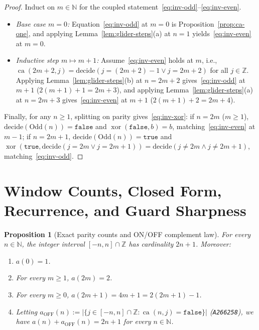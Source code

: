 \documentclass[11pt]{article}
\newtheorem{proposition}[theorem]{Proposition}
\theoremstyle{definition}
\newcommand{\N}{\mathbb{N}}
\newcommand{\Z}{\mathbb{Z}}
\newcommand{\seq}[1]{\texttt{#1}}
\newcommand{\ca}{\operatorname{ca}}
\begin{document}
\begin{proof}
Induct on $m \in \N$ for the coupled statement~\eqref{eq:inv-odd}--\eqref{eq:inv-even}.
\begin{itemize}
\item \emph{Base case $m = 0$:} Equation~\eqref{eq:inv-odd} at $m = 0$ is Proposition~\ref{prop:ca-one}, and applying Lemma~\ref{lem:glider-steps}(a) at $n = 1$ yields~\eqref{eq:inv-even} at $m = 0$.
\item \emph{Inductive step $m \mapsto m + 1$:} Assume~\eqref{eq:inv-even} holds at $m$, i.e., $\ca(2m + 2, j) = \mathrm{decide}(j = (2m + 2) - 1 \lor j = 2m + 2)$ for all $j \in \Z$. Applying Lemma~\ref{lem:glider-steps}(b) at $n = 2m + 2$ gives~\eqref{eq:inv-odd} at $m + 1$ ($2(m + 1) + 1 = 2m + 3$), and applying Lemma~\ref{lem:glider-steps}(a) at $n = 2m + 3$ gives~\eqref{eq:inv-even} at $m + 1$ ($2(m + 1) + 2 = 2m + 4$).
\end{itemize}
Finally, for any $n \ge 1$, splitting on parity gives~\eqref{eq:inv-xor}: if $n = 2m$ ($m \ge 1$), $\mathrm{decide}(\mathrm{Odd}(n)) = \mathtt{false}$ and $\operatorname{xor}(\mathtt{false}, b) = b$, matching~\eqref{eq:inv-even} at $m - 1$; if $n = 2m + 1$, $\mathrm{decide}(\mathrm{Odd}(n)) = \mathtt{true}$ and $\operatorname{xor}(\mathtt{true}, \mathrm{decide}(j = 2m \lor j = 2m + 1)) = \mathrm{decide}(j \ne 2m \land j \ne 2m + 1)$, matching~\eqref{eq:inv-odd}.
\end{proof}

\section{Window Counts, Closed Form, Recurrence, and Guard Sharpness}

\begin{proposition}[Exact parity counts and ON/OFF complement law]
\label{prop:counts}
For every $n \in \N$, the integer interval $[-n, n] \cap \Z$ has cardinality $2n + 1$. Moreover:
\begin{enumerate}
\item[\textup{(a)}] $a(0) = 1$.
\item[\textup{(b)}] For every $m \ge 1$, $a(2m) = 2$.
\item[\textup{(c)}] For every $m \ge 0$, $a(2m + 1) = 4m + 1 = 2(2m + 1) - 1$.
\item[\textup{(d)}] Letting $a_{\mathrm{OFF}}(n) := |\{j \in [-n, n] \cap \Z : \ca(n, j) = \mathtt{false}\}|$ (\seq{A266258}), we have $a(n) + a_{\mathrm{OFF}}(n) = 2n + 1$ for every $n \in \N$.
\end{enumerate}
\end{proposition}
\end{document}
